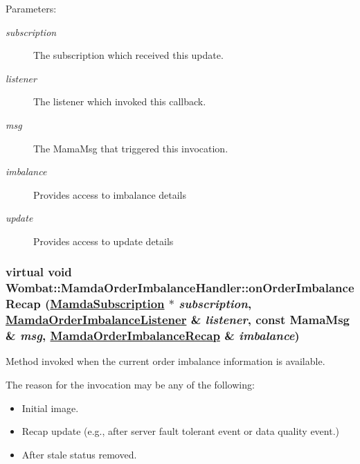 \begin{Desc}
\item[Parameters:]
\begin{description}
\item[{\em subscription}]The subscription which received this update. \item[{\em listener}]The listener which invoked this callback. \item[{\em msg}]The Mama\-Msg that triggered this invocation. \item[{\em imbalance}]Provides access to imbalance details \item[{\em update}]Provides access to update details \end{description}
\end{Desc}
\hypertarget{classWombat_1_1MamdaOrderImbalanceHandler_4723195ebde988b95b39f58b2ab0b77e}{
\subsubsection[onOrderImbalanceRecap]{\setlength{\rightskip}{0pt plus 5cm}virtual void Wombat::Mamda\-Order\-Imbalance\-Handler::on\-Order\-Imbalance\-Recap (\hyperlink{classWombat_1_1MamdaSubscription}{Mamda\-Subscription} $\ast$ {\em subscription}, \hyperlink{classWombat_1_1MamdaOrderImbalanceListener}{Mamda\-Order\-Imbalance\-Listener} \& {\em listener}, const Mama\-Msg \& {\em msg}, \hyperlink{classWombat_1_1MamdaOrderImbalanceRecap}{Mamda\-Order\-Imbalance\-Recap} \& {\em imbalance})}}
\label{classWombat_1_1MamdaOrderImbalanceHandler_4723195ebde988b95b39f58b2ab0b77e}


Method invoked when the current order imbalance information is available. 

The reason for the invocation may be any of the following:\begin{itemize}
\item Initial image.\item Recap update (e.g., after server fault tolerant event or data quality event.)\item After stale status removed. 
\end{itemize}
